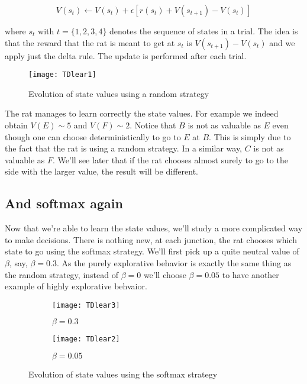 \[V(s_t) \leftarrow V(s_t) + \epsilon[r(s_t)+V(s_{t+1})-V(s_t)]\]

\noindent
where $s_t$ with $t = \{1,2,3,4\}$ denotes the sequence of states in a trial.
The idea is that the reward that the rat is meant to get at $s_t$ is 
$V(s_{t+1}) - V(s_t)$ and we apply just the delta rule. The update is 
performed after each trial.

\vspace*{-1em}
\begin{figure}[H]
  \centering
  \texttt{[image: TDlear1]}
  \caption {Evolution of state values using a random strategy}
\end{figure}

The rat manages to learn correctly the state values. For example we indeed
obtain $V(E) \sim 5$ and $V(F) \sim 2$. Notice that $B$ is not as valuable as 
$E$ even though one can choose deterministically to go to $E$ at $B$. This is
simply due to the fact that the rat is using a random strategy. In a similar
way, $C$ is not as valuable as $F$. We'll see later that if the rat chooses
almost surely to go to the side with the larger value, the result will be
different.

\subsection{And softmax again}

Now that we're able to learn the state values, we'll study a more complicated
way to make decisions. There is nothing new, at each junction, the rat chooses
which state to go using the softmax strategy.
We'll first pick up a quite neutral value of $\beta$, 
say, $\beta = 0.3$. As the purely explorative behavior is exactly the same
thing as the random strategy, instead of $\beta = 0$ we'll choose 
$\beta = 0.05$ to have another example of highly explorative behvaior.

\vspace*{-0.2em}
\begin{figure}[H]
  \centering
  \begin{subfigure}[]{0.45\textwidth}
    \centering
    \texttt{[image: TDlear3]}
    \caption{$\beta = 0.3$}
  \end{subfigure}
  \begin{subfigure}[]{0.45\textwidth}
    \centering
    \texttt{[image: TDlear2]}
    \caption{$\beta = 0.05$}
  \end{subfigure}

  \caption {Evolution of state values using the softmax strategy}
\end{figure}

